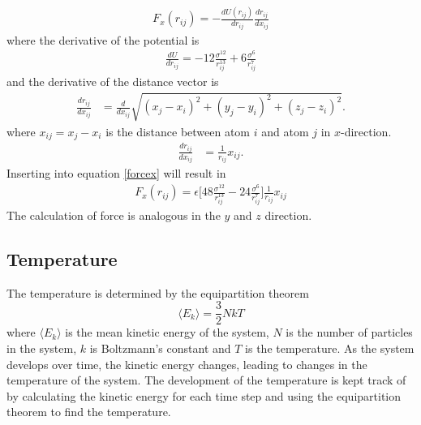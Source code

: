 \documentclass{article}
\begin{document}
\begin{align}
	F_x(r_{ij}) = - \frac{dU(r_{ij})}{dr_{ij}}\frac{dr_{ij}}{dx_{ij}}
	\label{forcex}
\end{align}
where the derivative of the potential is
\begin{align}
	\frac{dU}{dr_{ij}}=-12\frac{\sigma^{12}}{r_{ij}^{13}} + 6 \frac{\sigma^6}{r_{ij}^7}
\end{align}
and the derivative of the distance vector is
\begin{align}
	\frac{dr_{ij}}{dx_{ij}}&=\frac{d}{dx_{ij}}\sqrt{(x_j-x_i)^2+(y_j-y_i)^2+(z_j-z_i)^2}.
\end{align}
where $x_{ij}=x_j-x_i$ is the distance between atom $i$ and atom $j$ in $x$-direction.
\begin{align}
	\frac{dr_{ij}}{dx_{ij}}&=\frac{1}{r_{ij}}x_{ij}.
\end{align}
Inserting into equation \ref{forcex} will result in
\begin{align}
	F_x(r_{ij})= \epsilon \Big[48\frac{\sigma^{12}}{r_{ij}^{13}} - 24 \frac{\sigma^6}{r_{ij}^7}\Big]\frac{1}{r_{ij}}x_{ij}
\end{align}
The calculation of force is analogous in the $y$ and $z$ direction.


\subsection{Temperature}
The temperature is determined by the equipartition theorem
$$\langle E_k\rangle=\frac{3}{2}NkT$$
where $\langle E_k\rangle$ is the mean kinetic energy of the system, $N$ is the number of particles in the system, $k$ is Boltzmann's constant and $T$ is the temperature. As the system develops over time, the kinetic energy changes, leading to changes in the temperature of the system. The development of the temperature is kept track of by calculating the kinetic energy for each time step and using the equipartition theorem to find the temperature.
\end{document}
